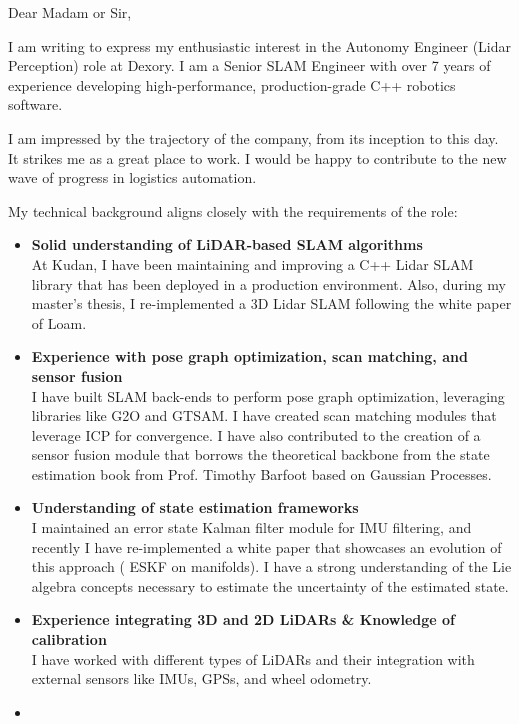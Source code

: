 


Dear Madam or Sir,
\medskip

I am writing to express my enthusiastic interest in the Autonomy Engineer
(Lidar Perception) role at Dexory.
I am a Senior SLAM Engineer with over 7 years of experience developing
high-performance, production-grade C++ robotics software.

I am impressed by the trajectory of the company, from its inception to this day.
It strikes me as a great place to work.
I would be happy to contribute to the new wave of progress in logistics
automation. 
\medskip

My technical background aligns closely with the requirements of the role:
\begin{itemize}
  \item
    \textbf{Solid understanding of LiDAR-based SLAM algorithms} \\
    At Kudan, I have been maintaining and improving a C++ Lidar SLAM library
    that has been deployed in a production environment.
    Also, during my master's thesis, I re-implemented a 3D Lidar SLAM
    following the white paper of Loam.
  \item
    \textbf{Experience with pose graph optimization, scan matching, and
    sensor fusion} \\
    I have built SLAM back-ends to perform pose graph optimization, leveraging
    libraries like G2O and GTSAM.
    I have created scan matching modules that leverage ICP for convergence.
    I have also contributed to the creation of a sensor fusion module that
    borrows the theoretical backbone from the state estimation book from
    Prof. Timothy Barfoot based on Gaussian Processes.
  \item
    \textbf{ Understanding of state estimation frameworks} \\
    I maintained an error state Kalman filter module for IMU filtering, and
    recently I have re-implemented a white paper that showcases an evolution of
    this approach ( ESKF on manifolds).
    I have a strong understanding of the Lie algebra concepts necessary to
    estimate the uncertainty of the estimated state.
  \item
    \textbf{Experience integrating 3D and 2D LiDARs \& Knowledge of calibration}
    \\
    I have worked with different types of LiDARs and their integration with
    external sensors like IMUs, GPSs, and wheel odometry.
  \item

\end{itemize}
